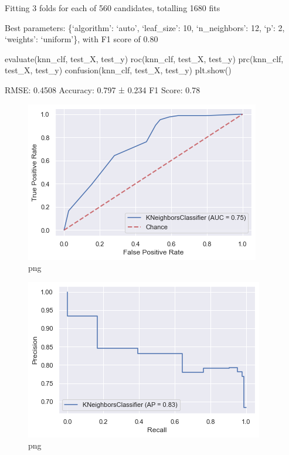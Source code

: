 \documentclass[]{article}
\newenvironment{Shaded}{}{}
\newcommand{\NormalTok}[1]{#1}
\begin{document}
Fitting 3 folds for each of 560 candidates, totalling 1680 fits

Best parameters: \{`algorithm': `auto', `leaf\_size': 10,
`n\_neighbors': 12, `p': 2, `weights': `uniform'\}, with F1 score of
0.80

\begin{Shaded}
\begin{Highlighting}[]
\NormalTok{evaluate(knn_clf, test_X, test_y)}
\NormalTok{roc(knn_clf, test_X, test_y)}
\NormalTok{prc(knn_clf, test_X, test_y)}
\NormalTok{confusion(knn_clf, test_X, test_y)}
\NormalTok{plt.show()}
\end{Highlighting}
\end{Shaded}

RMSE: 0.4508 Accuracy: 0.797 ± 0.234 F1 Score: 0.78

\begin{figure}
\centering
\includegraphics{notebook_files/notebook_48_1.png}
\caption{png}
\end{figure}

\begin{figure}
\centering
\includegraphics{notebook_files/notebook_48_2.png}
\caption{png}
\end{figure}
\end{document}
